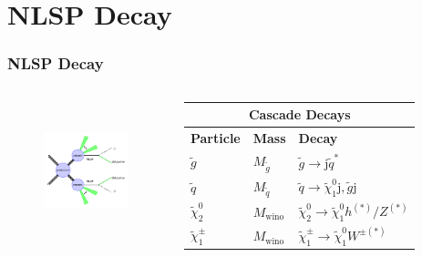 \documentclass[12pt]{beamer}
\begin{document}
\section{NLSP Decay}
\begin{frame}
\frametitle{NLSP Decay}
\begin{columns}
\begin{figure}
\includegraphics[width=4cm,height=4cm,scale=0.5]{PLOTS/susy-decay.png}
\end{figure}
\begin{table}
\begin{minipage}[b]{1.0\linewidth}\centering
 \begin{tabular}{|l||l|l|}
  \hline
  \multicolumn{3}{|c|}{\bfseries{Cascade Decays}} \\
  \hline 
  \bfseries{Particle} &\bfseries{ Mass }& \bfseries{Decay} \\
   \hline
 $\tilde{g}$ & $M_{\tilde{g}}$ & $\tilde{g}\rightarrow \mbox{j} \tilde{q}^{*}$ \\ 
  \hline
  $\tilde{q}$ & $M_{\tilde{q}}$ & $\tilde{q}\rightarrow \tilde{\chi}^{0}_{1}\mbox{j}, \tilde{g} \mbox{j}$\\
  \hline
   $\tilde{\chi}^{0}_{2}$ & $M_{\mbox{wino}}$ & $\tilde{\chi}^{0}_{2}\rightarrow \tilde{\chi}^{0}_{1}h^{(*)}/Z^{(*)}$\\
  \hline
   $\tilde{\chi}^{\pm}_{1}$ & $M_{\mbox{wino}}$ & $\tilde{\chi}^{\pm}_{1}\rightarrow \tilde{\chi}^{0}_{1}W^{\pm(*)}$\\
  \hline
  \end{tabular}
  \end{minipage}
\end{table}
\end{columns}


\end{frame}
\end{document}
